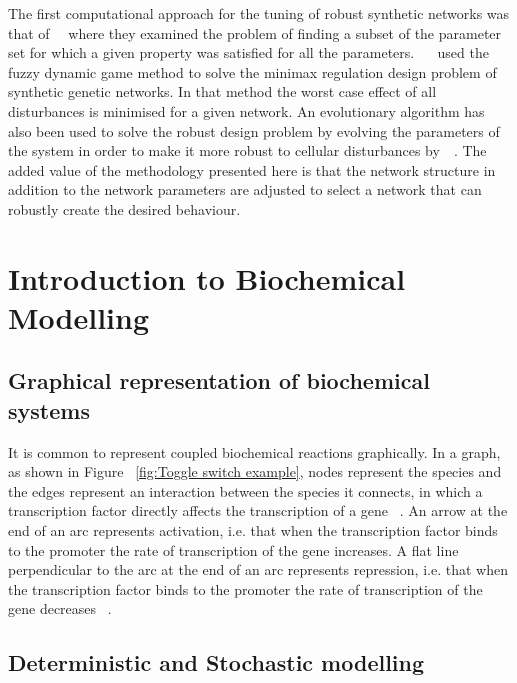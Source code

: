 The first computational approach for the tuning of robust synthetic networks was that of~\textcite{Batt:2007jl}~\autocite{Batt:2007jl} where they examined the problem of finding a subset of the parameter set for which a given property was satisfied for all the parameters. ~\textcite{Chen:2009ea}~\autocite{Chen:2009ea} used the fuzzy  dynamic game method to solve the minimax regulation design problem of synthetic genetic networks. In that method the worst case effect of all disturbances is minimised for a given network. An evolutionary algorithm has also been used to solve the robust design problem by evolving the parameters of the system in order to make it more robust to cellular disturbances by~\textcite{Chen:2011hj}~\autocite{Chen:2011hj}. The added value of the methodology presented here is that the network structure in addition to the network parameters are adjusted to select a network that can robustly create the desired behaviour.	

\section{Introduction to Biochemical Modelling}
\subsection{Graphical representation of biochemical systems}

It is common to represent coupled biochemical reactions graphically. In a graph, as shown in Figure ~\ref{fig:Toggle switch example}, nodes represent the species and the edges represent an interaction between the species it connects, in which a transcription factor directly affects the transcription of a gene ~\cite{alon:2007b}. An arrow at the end of an arc represents activation, i.e. that when the transcription factor binds to the promoter the rate of transcription of the gene increases. A flat line perpendicular to the arc at the end of an arc represents repression, i.e. that when the transcription factor binds to the promoter the rate of transcription of the gene decreases ~\cite{alon:2007b}.

\subsection{Deterministic and Stochastic modelling}

